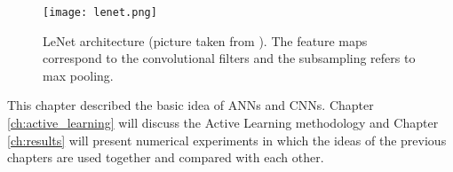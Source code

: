 \begin{figure}[H]
    \centering
    \texttt{[image: lenet.png]}
    \caption{LeNet architecture (picture taken from \cite{lecun1998gradient}). The feature maps correspond to the convolutional filters and the subsampling refers to max pooling.}
    \label{fig:lenet_architecture}
\end{figure}

This chapter described the basic idea of ANNs and CNNs. Chapter \ref{ch:active_learning} will discuss the Active Learning methodology and Chapter \ref{ch:results} will present numerical experiments in which the ideas of the previous chapters are used together and compared with each other.
